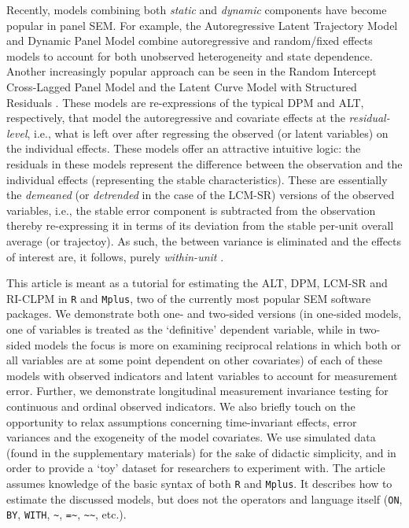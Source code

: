 \documentclass[]{interact}
\theoremstyle{plain}%
\theoremstyle{definition}
\theoremstyle{remark}
\begin{document}
Recently, models combining both \emph{static} and \emph{dynamic}
components have become popular in panel SEM. For example, the
Autoregressive Latent Trajectory Model
\citep[ALT,][]{Bollen2004, Curran2001} and Dynamic Panel Model
\citep[DPM,][]{Allison2017, Williams2018, Moral2019} combine
autoregressive and random/fixed effects models to account for both
unobserved heterogeneity and state dependence. Another increasingly
popular approach can be seen in the Random Intercept Cross-Lagged Panel
Model
\citep[RI-CLPM,][]{Hamaker2015, Mulder2020, Zyphur2019a, Zyphur2019b}
and the Latent Curve Model with Structured Residuals
\citep[LCM-SR,][]{Curran2014}. These models are re-expressions of the
typical DPM and ALT, respectively, that model the autoregressive and
covariate effects at the \emph{residual-level}, i.e., what is left over
after regressing the observed (or latent variables) on the individual
effects. These models offer an attractive intuitive logic: the residuals
in these models represent the difference between the observation and the
individual effects (representing the stable characteristics). These are
essentially the \emph{demeaned} (or \emph{detrended} in the case of the
LCM-SR) versions of the observed variables, i.e., the stable error
component is subtracted from the observation thereby re-expressing it in
terms of its deviation from the stable per-unit overall average (or
trajectoy). As such, the between variance is eliminated and the effects
of interest are, it follows, purely \emph{within-unit}
\citep{Hamaker2015}.

This article is meant as a tutorial for estimating the ALT, DPM, LCM-SR
and RI-CLPM in \texttt{R} and \texttt{Mplus}, two of the currently most
popular SEM software packages. We demonstrate both one- and two-sided
versions (in one-sided models, one of variables is treated as the
`definitive' dependent variable, while in two-sided models the focus is
more on examining reciprocal relations in which both or all variables
are at some point dependent on other covariates) of each of these models
with observed indicators and latent variables to account for measurement
error. Further, we demonstrate longitudinal measurement invariance
testing for continuous and ordinal observed indicators. We also briefly
touch on the opportunity to relax assumptions concerning time-invariant
effects, error variances and the exogeneity of the model covariates. We
use simulated data (found in the supplementary materials) for the sake
of didactic simplicity, and in order to provide a `toy' dataset for
researchers to experiment with. The article assumes knowledge of the
basic syntax of both \texttt{R} and \texttt{Mplus}. It describes how to
estimate the discussed models, but does not the operators and language
itself (\texttt{ON}, \texttt{BY}, \texttt{WITH},
\texttt{\textasciitilde{}}, \texttt{=\textasciitilde{}},
\texttt{\textasciitilde{}\textasciitilde{}}, etc.).
\end{document}
